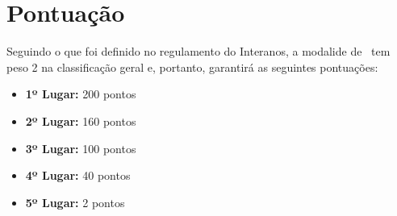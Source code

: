 \section{Pontuação}

Seguindo o que foi definido no regulamento do Interanos, a modalide de \Modality\ tem peso 2 na classificação geral e, portanto, garantirá as seguintes pontuações:

\begin{itemize}
    \item \textbf{1º Lugar:} 200 pontos
    \item \textbf{2º Lugar:} 160 pontos
    \item \textbf{3º Lugar:} 100 pontos
    \item \textbf{4º Lugar:} 40 pontos
    \item \textbf{5º Lugar:} 2 pontos
\end{itemize}